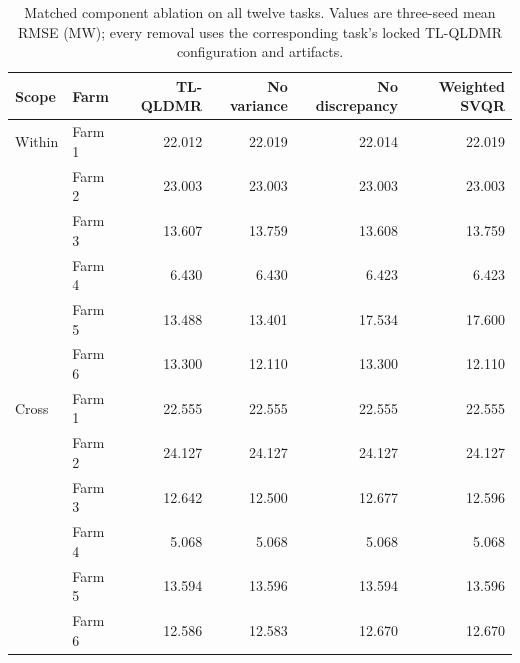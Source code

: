 \begin{table}[pos=t]
\centering
\color{blue}
\caption{Matched component ablation on all twelve tasks. Values are three-seed mean RMSE (MW); every removal uses the corresponding task's locked TL-QLDMR configuration and artifacts.}
\label{tab:selection-v2-matched-ablation}
\small
\setlength{\tabcolsep}{4pt}
\begin{tabular}{llrrrr}
\toprule
Scope & Farm & TL-QLDMR & No variance & No discrepancy & Weighted SVQR \\
\midrule
Within & Farm 1 & 22.012 & 22.019 & 22.014 & 22.019 \\
 & Farm 2 & 23.003 & 23.003 & 23.003 & 23.003 \\
 & Farm 3 & 13.607 & 13.759 & 13.608 & 13.759 \\
 & Farm 4 & 6.430 & 6.430 & 6.423 & 6.423 \\
 & Farm 5 & 13.488 & 13.401 & 17.534 & 17.600 \\
 & Farm 6 & 13.300 & 12.110 & 13.300 & 12.110 \\
\midrule
Cross & Farm 1 & 22.555 & 22.555 & 22.555 & 22.555 \\
 & Farm 2 & 24.127 & 24.127 & 24.127 & 24.127 \\
 & Farm 3 & 12.642 & 12.500 & 12.677 & 12.596 \\
 & Farm 4 & 5.068 & 5.068 & 5.068 & 5.068 \\
 & Farm 5 & 13.594 & 13.596 & 13.594 & 13.596 \\
 & Farm 6 & 12.586 & 12.583 & 12.670 & 12.670 \\
\bottomrule
\end{tabular}
\end{table}

